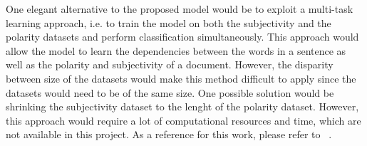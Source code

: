 One elegant alternative to the proposed model would be to exploit a multi-task learning approach, i.e. to train the model on both the subjectivity and the polarity datasets 
and perform classification simultaneously. This approach would allow the model to learn the dependencies between the words in a sentence as well as the polarity and subjectivity
of a document. However, the disparity between size of the datasets would make this method difficult to apply since the datasets would need to be of the same size.
One possible solution would be shrinking the subjectivity dataset to the lenght of the polarity dataset. However, this approach would require a lot of 
computational resources and time, which are not available in this project. As a reference for this work, please refer to ~\cite{mtl}.\\
